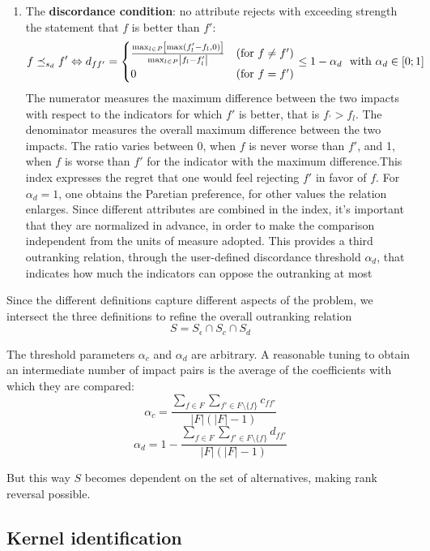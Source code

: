 \begin{enumerate}
	\item The \textbf{discordance condition}: no attribute rejects with exceeding strength the statement that $f$ is better than $f'$:
	$$ f \preceq_{s_d} f' \Leftrightarrow d_{ff'} = \begin{cases}
		\frac{\max_{l \in P} \left[\max (f_l' - f_l, 0)\right]}{\max_{l \in P} \left|f_l - f_l'\right|} & (\text{for } f \neq f') \\
		0 & (\text{for } f = f')
	\end{cases} \leq 1 - \alpha_d \ \text{ with } \alpha_d \in [0;1] $$
	The numerator measures the maximum difference between the two impacts with respect to the indicators for which $f'$ is better, that is $f_' > f_l$. The denominator measures the overall maximum difference between the two impacts. The ratio varies between 0, when $f$ is never worse than $f'$, and 1, when $f$ is worse than $f'$ for the indicator with the maximum difference.This index expresses the regret that one would feel rejecting $f'$ in favor of $f$. For $\alpha_d = 1$, one obtains the Paretian preference, for other values the relation enlarges. Since different attributes are combined in the index, it's important that they are normalized in advance, in order to make the comparison independent from the units of measure adopted. This provides a third outranking relation, through the user-defined discordance threshold $\alpha_d$, that indicates how much the indicators can oppose the outranking at most
\end{enumerate}

Since the different definitions capture different aspects of the problem, we intersect the three definitions to refine the overall outranking relation
$$ S = S_\epsilon \cap S_c \cap S_d $$

The threshold parameters $\alpha_c$ and $\alpha_d$ are arbitrary. A reasonable tuning to obtain an intermediate number of impact pairs is the average of the coefficients with which they are compared:
$$ \alpha_c = \frac{\sum_{f \in F} \sum_{f' \in F \setminus \{f\}} c_{ff'}}{|F| (|F| - 1)} $$
$$ \alpha_d = 1 - \frac{\sum_{f \in F} \sum_{f' \in F \setminus \{f\}} d_{ff'}}{|F| (|F| - 1)} $$

But this way $S$ becomes dependent on the set of alternatives, making rank reversal possible.

\subsection{Kernel identification}

